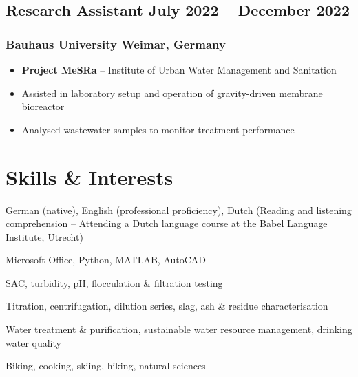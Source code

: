 \documentclass[11pt]{article} %
\begin{document}
\subsection{Research Assistant \hfill July 2022 – December 2022}
\subsubsection{Bauhaus University \hfill Weimar, Germany}
\begin{itemize}
	\item \textbf{Project MeSRa} – Institute of Urban Water Management and Sanitation
	\item Assisted in laboratory setup and operation of gravity-driven membrane bioreactor 
	\item Analysed wastewater samples to monitor treatment performance
\end{itemize}

\section{Skills \& Interests}
\begin{description}[itemsep=0pt]
	\item[Language] German (native), English (professional proficiency), Dutch (Reading and listening comprehension -- Attending a Dutch language course at the Babel Language Institute, Utrecht)
	\item[Technical] Microsoft Office, Python, MATLAB, AutoCAD
	\item[Water Analysis] SAC, turbidity, pH, flocculation \& filtration testing
	\item[Inorganic Analysis] Titration, centrifugation, dilution series, slag, ash \& residue characterisation
	\item[Scientific Interests] Water treatment \& purification, sustainable water resource management, drinking water quality
	\item[Interests] Biking, cooking, skiing, hiking, natural sciences
\end{description}
\end{document}
